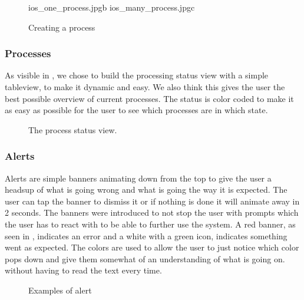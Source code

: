 \begin{figure}[ht]
	{ios_one_process.jpg}{b}
	{ios_many_process.jpg}{c}
\caption{Creating a process}
\label{fig:ios_creating_process}
\end{figure}
\FloatBarrier

\subsubsection{Processes}

As visible in , we chose to build the processing status view with a simple tableview, to make it dynamic and easy. We also think this gives the user the best possible overview of current processes. The status is color coded to make it as easy as possible for the user to see which processes are in which state.
\begin{figure}[h]
\caption{The process status view.}
\label{fig:ios_processingStatus}
\end{figure}
\FloatBarrier

\subsubsection{Alerts}
Alerts are simple banners animating down from the top to give the user a headsup of what is going wrong and what is going the way it is expected. The user can tap the banner to dismiss it or if nothing is done it will animate away in 2 seconds. The banners were introduced to not stop the user with prompts which the user has to react with to be able to further use the system. A red banner, as seen in , indicates an error and a white with a green icon, indicates something went as expected. The colors are used to allow the user to just notice which color pops down and give them somewhat of an understanding of what is going on. without having to read the text every time.
\begin{figure}[ht]
\caption{Examples of alert}
\label{fig:ios_alerts}
\end{figure}
\FloatBarrier


